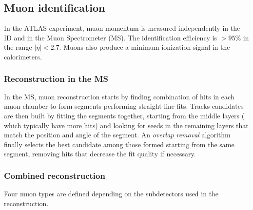 \documentclass[a4paper,twoside,12pt]{article}
\begin{document}
\subsection{Muon identification}
In the ATLAS experiment, muon momentum is measured independently in the ID and in the
Muon Spectrometer (MS). The identification efficiency is $> 95\%$\cite{PhysicsObjectReconstruction} in the
range $|\eta| < 2.7$. Muons also produce a minimum ionization signal in the calorimeters.\\

\subsubsection*{Reconstruction in the MS}
In the MS, muon reconstruction starts by finding combination of hits in each muon chamber
to form segments performing straight-line fits. Tracks candidates are then built by fitting the
segments together\cite{muonReconstruction}, starting from the middle layers (
which typically have more hits) and looking for seeds in the remaining layers that match
the position and angle of the segment. An \textit{overlap removal} algorithm finally
selects the best candidate among those formed starting from the same segment, 
removing hits that decrease the fit quality if necessary.

\subsubsection*{Combined reconstruction}
Four muon types are defined depending on the subdetectors used in the reconstruction.\\
\end{document}
